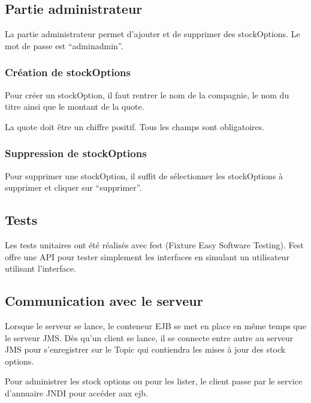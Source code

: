 \subsection{Partie administrateur}
La partie administrateur permet d'ajouter et de supprimer des stockOptions. Le mot de passe est ``adminadmin''.
\subsubsection{Création de stockOptions}
Pour créer un stockOption, il faut rentrer le nom de la compagnie, le nom du titre ainsi que le montant de la quote.

La quote doit être un chiffre positif. Tous les champs sont obligatoires.
\subsubsection{Suppression de stockOptions}
Pour supprimer une stockOption, il suffit de sélectionner les stockOptions à supprimer et cliquer sur ``supprimer''.
\subsection{Tests}
Les tests unitaires ont été réalisés avec fest (Fixture Easy Software Testing). Fest offre une API pour tester simplement les interfaces en simulant un utilisateur utilisant l'interface.

\subsection{Communication avec le serveur}
Lorsque le serveur se lance, le conteneur EJB se met en place en même temps que le serveur JMS. Dès qu'un client se lance, il se connecte entre autre au serveur JMS pour s'enregistrer sur le Topic qui contiendra les mises à jour des stock options.

Pour administrer les stock options ou pour les lister, le client passe par le service d'annuaire JNDI pour accéder aux ejb.